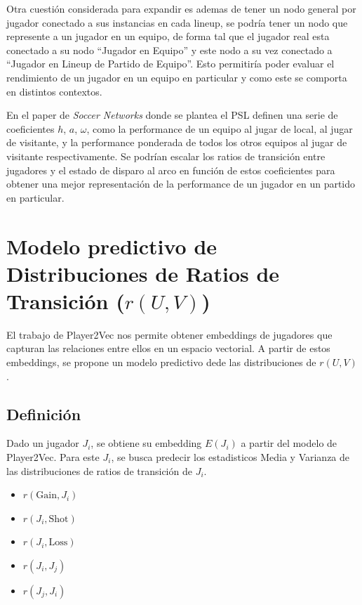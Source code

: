 \documentclass[
  a4paper,
]{article}
\providecommand{\tightlist}{%
  \setlength{\itemsep}{0pt}\setlength{\parskip}{0pt}}
\begin{document}
Otra cuestión considerada para expandir es ademas de tener un nodo
general por jugador conectado a sus instancias en cada lineup, se podría
tener un nodo que represente a un jugador en un equipo, de forma tal que
el jugador real esta conectado a su nodo ``Jugador en Equipo'' y este
nodo a su vez conectado a ``Jugador en Lineup de Partido de Equipo''.
Esto permitiría poder evaluar el rendimiento de un jugador en un equipo
en particular y como este se comporta en distintos contextos.

En el paper de \emph{Soccer Networks} donde se plantea el PSL definen
una serie de coeficientes \(h\), \(a\), \(\omega\), como la performance
de un equipo al jugar de local, al jugar de visitante, y la performance
ponderada de todos los otros equipos al jugar de visitante
respectivamente. Se podrían escalar los ratios de transición entre
jugadores y el estado de disparo al arco en función de estos
coeficientes para obtener una mejor representación de la performance de
un jugador en un partido en particular.

\newpage

\hypertarget{modelo-predictivo}{%
\section{\texorpdfstring{\textbf{Modelo predictivo de Distribuciones de
Ratios de Transición}
(\(r(U, V)\))}{Modelo predictivo de Distribuciones de Ratios de Transición (r(U, V))}}\label{modelo-predictivo}}

El trabajo de Player2Vec nos permite obtener embeddings de jugadores que
capturan las relaciones entre ellos en un espacio vectorial. A partir de
estos embeddings, se propone un modelo predictivo dede las
distribuciones de \(r(U, V)\).

\hypertarget{definiciuxf3n-1}{%
\subsection{Definición}\label{definiciuxf3n-1}}

Dado un jugador \(J_i\), se obtiene su embedding \(E(J_i)\) a partir del
modelo de Player2Vec. Para este \(J_i\), se busca predecir los
estadisticos Media y Varianza de las distribuciones de ratios de
transición de \(J_i\).

\begin{itemize}
\tightlist
\item
  \(r(\text{Gain}, J_i)\)
\item
  \(r(J_i, \text{Shot})\)
\item
  \(r(J_i, \text{Loss})\)
\item
  \(r(J_i, J_j)\)
\item
  \(r(J_j, J_i)\)
\end{itemize}
\end{document}
